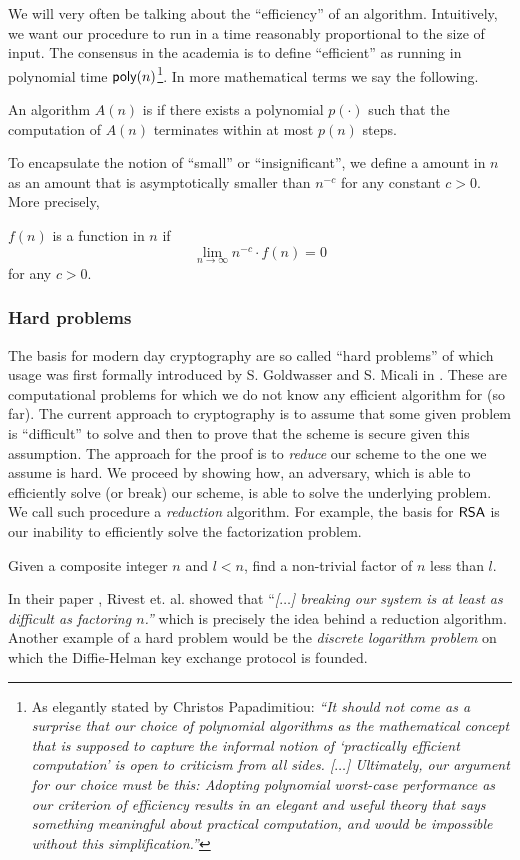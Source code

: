 We will very often be talking about the ``efficiency'' of an algorithm. Intuitively, we want our procedure to run in a time reasonably proportional to the size of input. The consensus in the academia is to define ``efficient'' as running in polynomial time $\textsf{poly}(n)$\footnote{As elegantly stated by Christos Papadimitiou: \textit{``It should not come as a surprise that our choice of polynomial algorithms as the mathematical concept that is supposed to capture the informal notion of ‘practically efficient computation’ is open to criticism from all sides. [$\ldots$] Ultimately, our argument for our choice must be this: Adopting polynomial worst-case performance as our criterion of efficiency results in an elegant and useful theory that says something meaningful about practical computation, and would be impossible without this simplification.''}}. In more mathematical terms we say the following. 
\begin{definition}
	An algorithm $A(n)$ is  if there exists a polynomial $p(\cdot)$ such that the computation of $A(n)$ terminates within at most $p(n)$ steps.
\end{definition}
To encapsulate the notion of ``small'' or ``insignificant'', we define a  amount in $n$ as an amount that is asymptotically smaller than $n^{-c}$ for any constant $c > 0$. More precisely, 
\begin{definition}\label{negl}
    $f (n)$ is a  function in $n$ if 
	\[\lim_{n \to \infty}n^{-c} \cdot f (n) = 0\]
	for any $c > 0$.
\end{definition}

\subsubsection*{Hard problems}
The basis for modern day cryptography are so called ``hard problems'' of which usage was first formally introduced by S. Goldwasser and S. Micali in \cite{prob-cryp}. These are computational problems for which we do not know any efficient algorithm for (so far). The current approach to cryptography is to assume that some given problem is ``difficult'' to solve and then to prove that the scheme is secure given this assumption. The approach for the proof is to \textit{reduce} our scheme to the one we assume is hard. We proceed by showing how, an adversary, which is able to efficiently solve (or break) our scheme, is able to solve the underlying problem. We call such procedure a \textit{reduction} algorithm. For example, the basis for $\textsf{RSA}$ is our inability to efficiently solve the factorization problem.
\begin{definition}
	Given a composite integer $n$ and $l < n$, find a non-trivial factor of $n$ less than $l$.
\end{definition}
In their paper \cite{rsa}, Rivest et. al. showed that ``\textit{[$\ldots$] breaking our system is at least as difficult as factoring $n$.''} which is precisely the idea behind a reduction algorithm. Another example of a hard problem would be the \textit{discrete logarithm problem} on which the Diffie-Helman key exchange protocol is founded.

